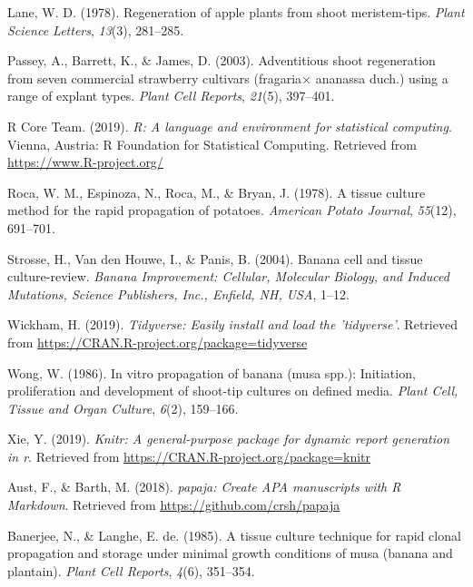 \documentclass[
  man]{apa6}
\begin{document}
\leavevmode\hypertarget{ref-lane1978regeneration}{}%
Lane, W. D. (1978). Regeneration of apple plants from shoot meristem-tips. \emph{Plant Science Letters}, \emph{13}(3), 281--285.

\leavevmode\hypertarget{ref-passey2003adventitious}{}%
Passey, A., Barrett, K., \& James, D. (2003). Adventitious shoot regeneration from seven commercial strawberry cultivars (fragaria\(\times\) ananassa duch.) using a range of explant types. \emph{Plant Cell Reports}, \emph{21}(5), 397--401.

\leavevmode\hypertarget{ref-R-base}{}%
R Core Team. (2019). \emph{R: A language and environment for statistical computing}. Vienna, Austria: R Foundation for Statistical Computing. Retrieved from \url{https://www.R-project.org/}

\leavevmode\hypertarget{ref-roca1978tissue}{}%
Roca, W. M., Espinoza, N., Roca, M., \& Bryan, J. (1978). A tissue culture method for the rapid propagation of potatoes. \emph{American Potato Journal}, \emph{55}(12), 691--701.

\leavevmode\hypertarget{ref-strosse2004banana}{}%
Strosse, H., Van den Houwe, I., \& Panis, B. (2004). Banana cell and tissue culture-review. \emph{Banana Improvement: Cellular, Molecular Biology, and Induced Mutations, Science Publishers, Inc., Enfield, NH, USA}, 1--12.

\leavevmode\hypertarget{ref-R-tidyverse}{}%
Wickham, H. (2019). \emph{Tidyverse: Easily install and load the 'tidyverse'}. Retrieved from \url{https://CRAN.R-project.org/package=tidyverse}

\leavevmode\hypertarget{ref-wong1986vitro}{}%
Wong, W. (1986). In vitro propagation of banana (musa spp.): Initiation, proliferation and development of shoot-tip cultures on defined media. \emph{Plant Cell, Tissue and Organ Culture}, \emph{6}(2), 159--166.

\leavevmode\hypertarget{ref-R-knitr}{}%
Xie, Y. (2019). \emph{Knitr: A general-purpose package for dynamic report generation in r}. Retrieved from \url{https://CRAN.R-project.org/package=knitr}

\leavevmode\hypertarget{ref-R-papaja}{}%
Aust, F., \& Barth, M. (2018). \emph{papaja: Create APA manuscripts with R Markdown}. Retrieved from \url{https://github.com/crsh/papaja}

\leavevmode\hypertarget{ref-banerjee1985tissue}{}%
Banerjee, N., \& Langhe, E. de. (1985). A tissue culture technique for rapid clonal propagation and storage under minimal growth conditions of musa (banana and plantain). \emph{Plant Cell Reports}, \emph{4}(6), 351--354.
\end{document}

